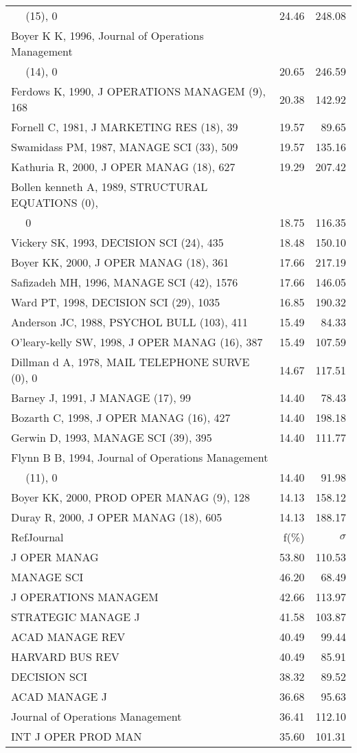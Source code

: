 \documentclass[a4paper,11pt]{report}
\begin{document}
\begin{landscape}
\begin{table}[!ht]
{\begin{tabular}{|l r r|}
$\quad$ (15), 0 & 24.46 & 248.08\\
Boyer K K, 1996, Journal of Operations Management &  & \\
$\quad$ (14), 0 & 20.65 & 246.59\\
Ferdows K, 1990, J OPERATIONS MANAGEM (9), 168 & 20.38 & 142.92\\
Fornell C, 1981, J MARKETING RES (18), 39 & 19.57 & 89.65\\
Swamidass PM, 1987, MANAGE SCI (33), 509 & 19.57 & 135.16\\
Kathuria R, 2000, J OPER MANAG (18), 627 & 19.29 & 207.42\\
Bollen kenneth A, 1989, STRUCTURAL EQUATIONS (0), &  & \\
$\quad$ 0 & 18.75 & 116.35\\
Vickery SK, 1993, DECISION SCI (24), 435 & 18.48 & 150.10\\
Boyer KK, 2000, J OPER MANAG (18), 361 & 17.66 & 217.19\\
Safizadeh MH, 1996, MANAGE SCI (42), 1576 & 17.66 & 146.05\\
Ward PT, 1998, DECISION SCI (29), 1035 & 16.85 & 190.32\\
Anderson JC, 1988, PSYCHOL BULL (103), 411 & 15.49 & 84.33\\
O'leary-kelly SW, 1998, J OPER MANAG (16), 387 & 15.49 & 107.59\\
Dillman d A, 1978, MAIL TELEPHONE SURVE (0), 0 & 14.67 & 117.51\\
Barney J, 1991, J MANAGE (17), 99 & 14.40 & 78.43\\
Bozarth C, 1998, J OPER MANAG (16), 427 & 14.40 & 198.18\\
Gerwin D, 1993, MANAGE SCI (39), 395 & 14.40 & 111.77\\
Flynn B B, 1994, Journal of Operations Management &  & \\
$\quad$ (11), 0 & 14.40 & 91.98\\
Boyer KK, 2000, PROD OPER MANAG (9), 128 & 14.13 & 158.12\\
Duray R, 2000, J OPER MANAG (18), 605 & 14.13 & 188.17\\
\hline
\hline
RefJournal & f(\%) & $\sigma$\\
\hline
J OPER MANAG & 53.80 & 110.53\\
MANAGE SCI & 46.20 & 68.49\\
J OPERATIONS MANAGEM & 42.66 & 113.97\\
STRATEGIC MANAGE J & 41.58 & 103.87\\
ACAD MANAGE REV & 40.49 & 99.44\\
HARVARD BUS REV & 40.49 & 85.91\\
DECISION SCI & 38.32 & 89.52\\
ACAD MANAGE J & 36.68 & 95.63\\
Journal of Operations Management & 36.41 & 112.10\\
INT J OPER PROD MAN & 35.60 & 101.31\\
\hline
\end{tabular}
}
\end{table}


\end{landscape}
\end{document}
